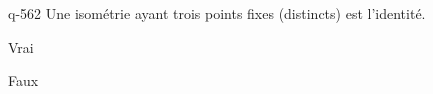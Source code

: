 \begin{truefalse}{q-562}
Une isométrie ayant trois points fixes (distincts) est l'identité.
\item Vrai
\item* Faux
\end{truefalse}

